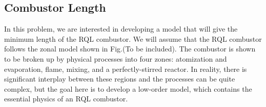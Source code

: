 \documentclass[11pt]{article}
\begin{document}
\subsection{Combustor Length}
In this problem, we are interested in developing a model that will give the minimum length of the RQL combustor. We will assume that the RQL combustor follows the zonal model shown in Fig.(To be included). The combustor is shown to be broken up by physical processes into four zones: atomization and evaporation, flame, mixing, and a perfectly-stirred reactor. In reality, there is significant interplay between these regions and the processes can be quite complex, but the goal here is to develop a low-order model, which contains the essential physics of an RQL combustor. 
\end{document}
